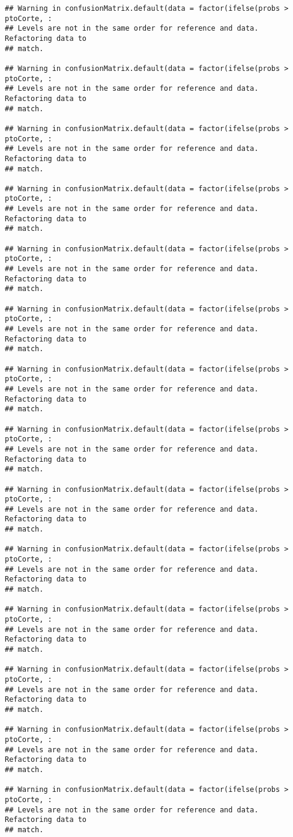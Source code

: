 \documentclass[
]{article}
\begin{document}
\begin{verbatim}
## Warning in confusionMatrix.default(data = factor(ifelse(probs > ptoCorte, :
## Levels are not in the same order for reference and data. Refactoring data to
## match.

## Warning in confusionMatrix.default(data = factor(ifelse(probs > ptoCorte, :
## Levels are not in the same order for reference and data. Refactoring data to
## match.

## Warning in confusionMatrix.default(data = factor(ifelse(probs > ptoCorte, :
## Levels are not in the same order for reference and data. Refactoring data to
## match.

## Warning in confusionMatrix.default(data = factor(ifelse(probs > ptoCorte, :
## Levels are not in the same order for reference and data. Refactoring data to
## match.

## Warning in confusionMatrix.default(data = factor(ifelse(probs > ptoCorte, :
## Levels are not in the same order for reference and data. Refactoring data to
## match.

## Warning in confusionMatrix.default(data = factor(ifelse(probs > ptoCorte, :
## Levels are not in the same order for reference and data. Refactoring data to
## match.

## Warning in confusionMatrix.default(data = factor(ifelse(probs > ptoCorte, :
## Levels are not in the same order for reference and data. Refactoring data to
## match.

## Warning in confusionMatrix.default(data = factor(ifelse(probs > ptoCorte, :
## Levels are not in the same order for reference and data. Refactoring data to
## match.

## Warning in confusionMatrix.default(data = factor(ifelse(probs > ptoCorte, :
## Levels are not in the same order for reference and data. Refactoring data to
## match.

## Warning in confusionMatrix.default(data = factor(ifelse(probs > ptoCorte, :
## Levels are not in the same order for reference and data. Refactoring data to
## match.

## Warning in confusionMatrix.default(data = factor(ifelse(probs > ptoCorte, :
## Levels are not in the same order for reference and data. Refactoring data to
## match.

## Warning in confusionMatrix.default(data = factor(ifelse(probs > ptoCorte, :
## Levels are not in the same order for reference and data. Refactoring data to
## match.

## Warning in confusionMatrix.default(data = factor(ifelse(probs > ptoCorte, :
## Levels are not in the same order for reference and data. Refactoring data to
## match.

## Warning in confusionMatrix.default(data = factor(ifelse(probs > ptoCorte, :
## Levels are not in the same order for reference and data. Refactoring data to
## match.
\end{verbatim}
\end{document}
